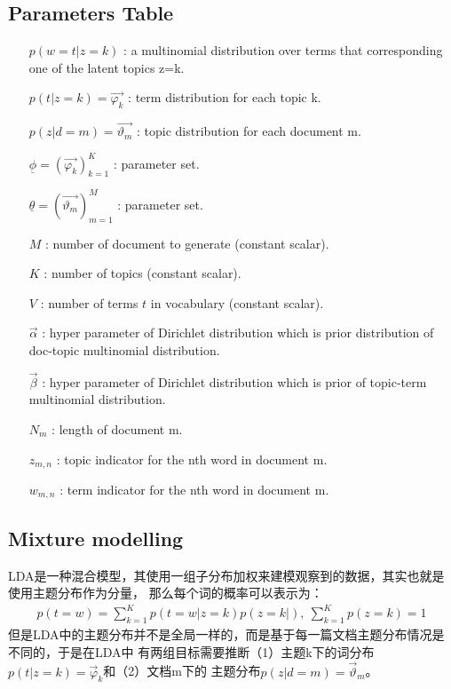 \documentclass[UTF8]{ctexart}
\begin{document}
\subsection{Parameters Table}
\begin{itemize}
\item[$p(w=t|z=k)$]: a multinomial distribution over terms that corresponding 
one of the latent topics z=k.
\item[$p(t|z=k)=\vec{\varphi_k}$]: term distribution for each topic k.
\item[$p(z|d=m)=\vec{\vartheta_m}$]: topic distribution for each document m.
\item[$\underline{\phi}=\left( \vec{\varphi_k} \right) _{k=1}^K$]: parameter set.
\item[$\underline{\theta}=\left( \vec{\vartheta_m}\right)_{m=1}^M$]: parameter set.
\item[$M$]: number of document to generate (constant scalar).
\item[$K$]: number of topics (constant scalar).
\item[$V$]: number of terms $t$ in vocabulary (constant scalar).
\item[$\vec{\alpha}$]: hyper parameter of Dirichlet distribution which is prior distribution of
 doc-topic multinomial distribution.
\item[$\vec{\beta}$]: hyper parameter of Dirichlet distribution which is prior of topic-term 
multinomial distribution.
\item[$N_m$]: length of document m.
\item[$z_{m,n}$]: topic indicator for the nth word in document m.
\item[$w_{m,n}$]: term indicator for the nth word in document m.
\end{itemize}

\subsection{Mixture modelling}
LDA是一种混合模型，其使用一组子分布加权来建模观察到的数据，其实也就是使用主题分布作为分量，
那么每个词的概率可以表示为：
\begin{align}
p(t=w) = \sum_{k=1}^K p(t=w|z=k)p(z=k|), \ \sum_{k=1}^K p(z=k) = 1
\end{align}
但是LDA中的主题分布并不是全局一样的，而是基于每一篇文档主题分布情况是不同的，于是在LDA中
有两组目标需要推断（1）主题k下的词分布$p(t|z=k)=\vec{\varphi}_k$和（2）文档m下的
主题分布$p(z|d=m)=\vec{\vartheta}_m$。
\end{document}
